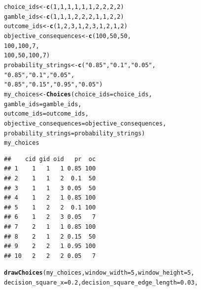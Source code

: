 \documentclass{article}\usepackage[]{graphicx}\usepackage[]{color}
\makeatletter
\newcommand{\hlnum}[1]{\textcolor[rgb]{0.686,0.059,0.569}{#1}}%
\newcommand{\hlstr}[1]{\textcolor[rgb]{0.192,0.494,0.8}{#1}}%
\newcommand{\hlstd}[1]{\textcolor[rgb]{0.345,0.345,0.345}{#1}}%
\newcommand{\hlkwb}[1]{\textcolor[rgb]{0.69,0.353,0.396}{#1}}%
\newcommand{\hlkwc}[1]{\textcolor[rgb]{0.333,0.667,0.333}{#1}}%
\newcommand{\hlkwd}[1]{\textcolor[rgb]{0.737,0.353,0.396}{\textbf{#1}}}%
\newenvironment{kframe}{%
 \def\at@end@of@kframe{}%
 \ifinner\ifhmode%
  \def\at@end@of@kframe{\end{minipage}}%
  \begin{minipage}{\columnwidth}%
 \fi\fi%
 \def\FrameCommand##1{\hskip\@totalleftmargin \hskip-\fboxsep
 \colorbox{shadecolor}{##1}\hskip-\fboxsep
     \hskip-\linewidth \hskip-\@totalleftmargin \hskip\columnwidth}%
 \MakeFramed {\advance\hsize-\width
   \@totalleftmargin\z@ \linewidth\hsize
   \@setminipage}}%
 {\par\unskip\endMakeFramed%
 \at@end@of@kframe}
\newenvironment{knitrout}{}{} %
\makeatother
\begin{document}
\begin{knitrout}
\color{fgcolor}\begin{kframe}
\begin{alltt}
\hlstd{choice_ids} \hlkwb{<-} \hlkwd{c}\hlstd{(}\hlnum{1}\hlstd{,} \hlnum{1}\hlstd{,} \hlnum{1}\hlstd{,} \hlnum{1}\hlstd{,} \hlnum{1}\hlstd{,} \hlnum{1}\hlstd{,} \hlnum{2}\hlstd{,} \hlnum{2}\hlstd{,} \hlnum{2}\hlstd{,} \hlnum{2}\hlstd{)}
\hlstd{gamble_ids} \hlkwb{<-} \hlkwd{c}\hlstd{(}\hlnum{1}\hlstd{,} \hlnum{1}\hlstd{,} \hlnum{1}\hlstd{,} \hlnum{2}\hlstd{,} \hlnum{2}\hlstd{,} \hlnum{2}\hlstd{,} \hlnum{1}\hlstd{,} \hlnum{1}\hlstd{,} \hlnum{2}\hlstd{,} \hlnum{2}\hlstd{)}
\hlstd{outcome_ids} \hlkwb{<-} \hlkwd{c}\hlstd{(}\hlnum{1}\hlstd{,} \hlnum{2}\hlstd{,} \hlnum{3}\hlstd{,} \hlnum{1}\hlstd{,} \hlnum{2}\hlstd{,} \hlnum{3}\hlstd{,} \hlnum{1}\hlstd{,} \hlnum{2}\hlstd{,} \hlnum{1}\hlstd{,} \hlnum{2}\hlstd{)}
\hlstd{objective_consequences} \hlkwb{<-} \hlkwd{c}\hlstd{(}\hlnum{100}\hlstd{,} \hlnum{50}\hlstd{,} \hlnum{50}\hlstd{,}
        \hlnum{100}\hlstd{,} \hlnum{100}\hlstd{,} \hlnum{7}\hlstd{,}
        \hlnum{100}\hlstd{,} \hlnum{50}\hlstd{,} \hlnum{100}\hlstd{,} \hlnum{7}\hlstd{)}
\hlstd{probability_strings} \hlkwb{<-} \hlkwd{c}\hlstd{(}\hlstr{"0.85"}\hlstd{,} \hlstr{"0.1"}\hlstd{,} \hlstr{"0.05"}\hlstd{,}
        \hlstr{"0.85"}\hlstd{,} \hlstr{"0.1"}\hlstd{,} \hlstr{"0.05"}\hlstd{,}
        \hlstr{"0.85"}\hlstd{,} \hlstr{"0.15"}\hlstd{,} \hlstr{"0.95"}\hlstd{,} \hlstr{"0.05"}\hlstd{)}
\hlstd{my_choices} \hlkwb{<-} \hlkwd{Choices}\hlstd{(}\hlkwc{choice_ids}\hlstd{=choice_ids,}
        \hlkwc{gamble_ids}\hlstd{=gamble_ids,}
        \hlkwc{outcome_ids}\hlstd{=outcome_ids,}
        \hlkwc{objective_consequences}\hlstd{=objective_consequences,}
        \hlkwc{probability_strings}\hlstd{=probability_strings)}
\hlstd{my_choices}
\end{alltt}
\begin{verbatim}
##    cid gid oid   pr  oc
## 1    1   1   1 0.85 100
## 2    1   1   2  0.1  50
## 3    1   1   3 0.05  50
## 4    1   2   1 0.85 100
## 5    1   2   2  0.1 100
## 6    1   2   3 0.05   7
## 7    2   1   1 0.85 100
## 8    2   1   2 0.15  50
## 9    2   2   1 0.95 100
## 10   2   2   2 0.05   7
\end{verbatim}
\begin{alltt}
\hlkwd{drawChoices}\hlstd{(my_choices,} \hlkwc{window_width}\hlstd{=}\hlnum{5}\hlstd{,} \hlkwc{window_height}\hlstd{=}\hlnum{5}\hlstd{,}
        \hlkwc{decision_square_x}\hlstd{=}\hlnum{0.2}\hlstd{,} \hlkwc{decision_square_edge_length}\hlstd{=}\hlnum{0.03}\hlstd{,}

\end{alltt}
\end{kframe}
\end{knitrout}
\end{document}
